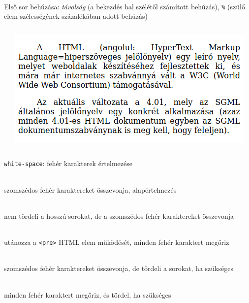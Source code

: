 \begin{frame}
  \begin{description}[m]
    \item[\texttt{text-indent}] \hfill \\ Első sor behúzása: \emph{távolság} (a bekezdés bal szélétől számított behúzás), \texttt{\%} (szülő elem szélességének százalékában adott behúzás)
  \end{description}
  \begin{columns}[c]
      \begin{exampleblock}{}
        \tiny
        
        
      \end{exampleblock}
      \includegraphics[width=\textwidth]{behuzas.png}
  \end{columns}
\end{frame}

\begin{frame}
  \texttt{white-space}: fehér karakterek értelmezése
  \begin{description}[m]
    \item[\texttt{normal}] \hfill \\ szomszédos fehér karaktereket összevonja, alapértelmezés
    \item[\texttt{nowrap}] \hfill \\ nem tördeli a hosszú sorokat, de a szomszédos fehér karaktereket összevonja
    \item[\texttt{pre}] \hfill \\ utánozza a \texttt{<pre>} HTML elem működését, minden fehér karaktert megőriz
    \item[\texttt{pre-line}] \hfill \\ szomszédos fehér karaktereket összevonja, de tördeli a sorokat, ha szükséges
    \item[\texttt{pre-wrap}] \hfill \\ minden fehér karaktert megőriz, és tördel, ha szükséges
  \end{description}
\end{frame}

